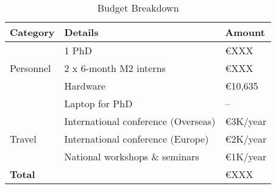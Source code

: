 \documentclass[11pt, a4paper]{article}
\begin{document}

\begin{table}[H]
    \centering
   \caption{Budget Breakdown}
    \begin{tabular}{|ll|l|}
        \toprule
        \textbf{Category} & \textbf{Details} & \textbf{Amount} \\
        \midrule
        \multirow{3}{*}{Personnel} 
            & 1 PhD & €XXX \\
            & 2 x 6-month M2 interns & €XXX \\
        \midrule
        \multirow{2}{*}{Equipment} 
            & Hardware & €10,635 \\
            & Laptop for PhD & -- \\
        \midrule
        \multirow{3}{*}{Travel} 
            & International conference (Overseas) & €3K/year \\
            & International conference (Europe) & €2K/year \\
            & National workshops \& seminars & €1K/year \\
        \midrule
        \textbf{Total} &  & €XXX \\
        \bottomrule
    \end{tabular}
    \label{tab:budget}
\end{table}
\newpage
\end{document}
